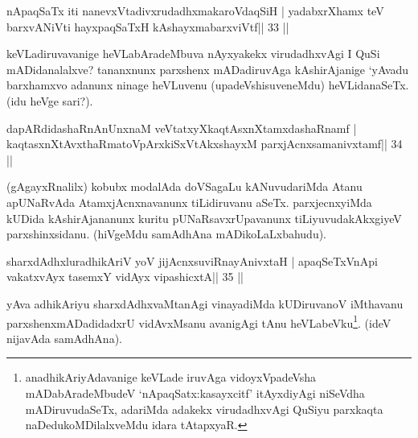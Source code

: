 
\begin{shl}
\footnotemark[4]nApaqSaTx iti nanevxVtadivxrudadhxmakaroVdaqSiH |
yadabxrXhamx teV barxvANiVti hayxpaqSaTxH kAshayxmabarxviVtf\hfill || 33 ||
\end{shl}

\begin{artha}
keVLadiruvavanige heVLabAradeMbuva nAyxyakekx virudadhxvAgi I QuSi mADidanalalxve? tananxnunx parxshenx mADadiruvAga kAshirAjanige `yAvadu barxhamxvo adanunx ninage heVLuvenu (upadeVshisuveneMdu) heVLidanaSeTx. (idu heVge sari?).
\end{artha}


\begin{shl}
dapARdidashaRnAnUnxnaM veVtatxyXkaqtAsxnXtamxdashaRnamf |
kaqtasxnXtAvxthaRmatoV\s pArxkiSxVtAkxshayxM parxjAcnxsamanivxtamf\hfill || 34 ||
\end{shl}

\begin{artha}
(gAgayxRnalilx) kobubx modalAda doVSagaLu kANuvudariMda Atanu apUNaRvAda AtamxjAcnxnavanunx tiLidiruvanu aSeTx. parxjecnxyiMda kUDida kAshirAjananunx kuritu pUNaRsavxrUpavanunx tiLiyuvudakAkxgiyeV parxshinxsidanu. (hiVgeMdu samAdhAna mADikoLaLxbahudu). 
\end{artha}


\begin{shl}
sharxdAdhxluradhikAriV yoV jijAcnxsuviRnayAnivxtaH |
apaqSeTxVnApi vakatxvAyx tasemxY vidAyx vipashicxtA\hfill || 35 ||
\end{shl}

\begin{artha}
yAva adhikAriyu sharxdAdhxvaMtanAgi vinayadiMda kUDiruvanoV iMthavanu  parxshenxmADadidadxrU vidAvxMsanu avanigAgi tAnu heVLabeVku\footnote[5]{anadhikAriyAdavanige keVLade iruvAga vidoyxVpadeVsha mADabAradeMbudeV `nApaqSatx:kasayxcitf' itAyxdiyAgi niSeVdha mADiruvudaSeTx, adariMda adakekx virudadhxvAgi QuSiyu parxkaqta naDedukoMDilalxveMdu idara tAtapxyaR.}. (ideV nijavAda samAdhAna).
\end{artha}

